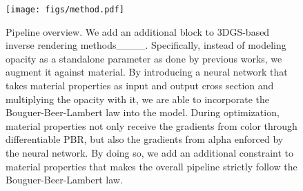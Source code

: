 \begin{figure}[t]
\begin{center}
\texttt{[image: figs/method.pdf]}
\end{center}
\caption{ Pipeline overview. We add an additional block to 3DGS-based inverse rendering methods____. Specifically, instead of modeling opacity as a standalone parameter as done by previous works, we augment it against material. By introducing a neural network that takes material properties as input and output cross section and multiplying the opacity with it, we are able to incorporate the Bouguer-Beer-Lambert law into the model. During optimization, material properties not only receive the gradients from color through differentiable PBR, but also the gradients from alpha enforced by the neural network. By doing so, we add an additional constraint to material properties that makes the overall pipeline strictly follow the Bouguer-Beer-Lambert law.}
\label{fig:method}
\end{figure}